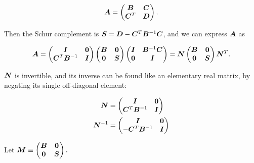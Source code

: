 \documentclass[twoside,10pt]{article}
\begin{document}
\begin{equation*}
  \bm{A} = \begin{pmatrix}
    \bm{B} & \bm{C} \\
    \bm{C}^T & \bm{D}
  \end{pmatrix}.
\end{equation*}

Then the Schur complement is $\bm{S} = \bm{D} - \bm{C}^T \bm{B}^{-1} \bm{C}$, and we can express $\bm{A}$ as

\begin{equation*}
  \bm{A} = \begin{pmatrix}
    \bm{I} & \bm{0} \\
    \bm{C}^T\bm{B}^{-1} & \bm{I}
  \end{pmatrix}
  \begin{pmatrix}
    \bm{B} & \bm{0} \\
    \bm{0} & \bm{S}
  \end{pmatrix}
  \begin{pmatrix}
    \bm{I} & \bm{B}^{-1}\bm{C} \\
    \bm{0} & \bm{I}
  \end{pmatrix}
  =
  \bm{N}
  \begin{pmatrix}
    \bm{B} & \bm{0} \\
    \bm{0} & \bm{S}
  \end{pmatrix}
  \bm{N}^T.
\end{equation*}

$\bm{N}$ is invertible, and its inverse can be found like an elementary real matrix, by negating its single off-diagonal element:

\begin{align*}
  \bm{N} &=
  \begin{pmatrix}
    \bm{I} & \bm{0} \\
    \bm{C}^T\bm{B}^{-1} & \bm{I}
  \end{pmatrix}\\
  \bm{N}^{-1} &=
  \begin{pmatrix}
    \bm{I} & \bm{0} \\
    -\bm{C}^T\bm{B}^{-1} & \bm{I}
  \end{pmatrix}
\end{align*}

Let $\bm{M} \equiv \begin{pmatrix}
    \bm{B} & \bm{0} \\
    \bm{0} & \bm{S}
  \end{pmatrix}.$
\end{document}
